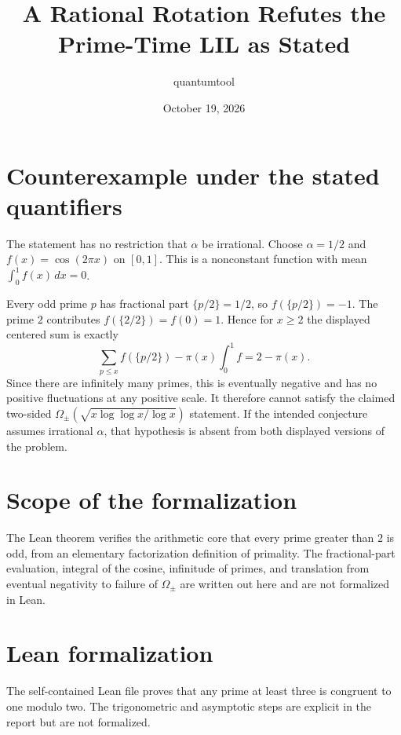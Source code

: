 \documentclass[11pt]{article}
\title{A Rational Rotation Refutes the Prime-Time LIL as Stated}
\author{quantumtool}
\date{October 19, 2026}
\begin{document}
\maketitle
\section*{Counterexample under the stated quantifiers}
The statement has no restriction that $\alpha$ be irrational. Choose $\alpha=1/2$ and $f(x)=\cos(2\pi x)$ on $[0,1]$. This is a nonconstant function with mean $\int_0^1 f(x)\,dx=0$.

Every odd prime $p$ has fractional part $\{p/2\}=1/2$, so $f(\{p/2\})=-1$. The prime $2$ contributes $f(\{2/2\})=f(0)=1$. Hence for $x\ge 2$ the displayed centered sum is exactly
\[
  \sum_{p\le x} f(\{p/2\})-\pi(x)\int_0^1f
  =2-\pi(x).
\]
Since there are infinitely many primes, this is eventually negative and has no positive fluctuations at any positive scale. It therefore cannot satisfy the claimed two-sided $\Omega_{\pm}(\sqrt{x\log\log x/\log x})$ statement. If the intended conjecture assumes irrational $\alpha$, that hypothesis is absent from both displayed versions of the problem.

\section*{Scope of the formalization}
The Lean theorem verifies the arithmetic core that every prime greater than $2$ is odd, from an elementary factorization definition of primality. The fractional-part evaluation, integral of the cosine, infinitude of primes, and translation from eventual negativity to failure of $\Omega_{\pm}$ are written out here and are not formalized in Lean.
\section*{Lean formalization}
The self-contained Lean file proves that any prime at least three is congruent to one modulo two. The trigonometric and asymptotic steps are explicit in the report but are not formalized.
\end{document}
